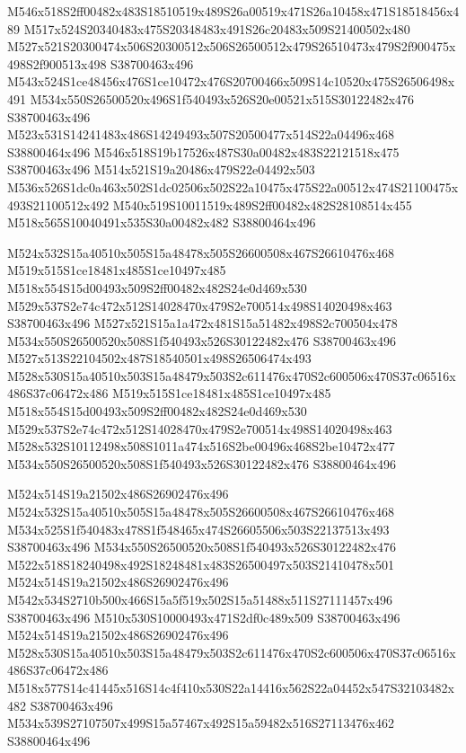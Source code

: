 \documentclass{article}
\begin{document}
\begin{multicols}{2}
M546x518S2ff00482x483S18510519x489S26a00519x471S26a10458x471S18518456x489 M517x524S20340483x475S20348483x491S26c20483x509S21400502x480 M527x521S20300474x506S20300512x506S26500512x479S26510473x479S2f900475x498S2f900513x498 S38700463x496 M543x524S1ce48456x476S1ce10472x476S20700466x509S14c10520x475S26506498x491 M534x550S26500520x496S1f540493x526S20e00521x515S30122482x476 S38700463x496 M523x531S14241483x486S14249493x507S20500477x514S22a04496x468 S38800464x496 M546x518S19b17526x487S30a00482x483S22121518x475 S38700463x496 M514x521S19a20486x479S22e04492x503 M536x526S1dc0a463x502S1dc02506x502S22a10475x475S22a00512x474S21100475x493S21100512x492 M540x519S10011519x489S2ff00482x482S28108514x455 M518x565S10040491x535S30a00482x482 S38800464x496

M524x532S15a40510x505S15a48478x505S26600508x467S26610476x468 M519x515S1ce18481x485S1ce10497x485 M518x554S15d00493x509S2ff00482x482S24e0d469x530 M529x537S2e74c472x512S14028470x479S2e700514x498S14020498x463 S38700463x496 M527x521S15a1a472x481S15a51482x498S2c700504x478 M534x550S26500520x508S1f540493x526S30122482x476 S38700463x496 M527x513S22104502x487S18540501x498S26506474x493 M528x530S15a40510x503S15a48479x503S2c611476x470S2c600506x470S37c06516x486S37c06472x486 M519x515S1ce18481x485S1ce10497x485 M518x554S15d00493x509S2ff00482x482S24e0d469x530 M529x537S2e74c472x512S14028470x479S2e700514x498S14020498x463 M528x532S10112498x508S1011a474x516S2be00496x468S2be10472x477 M534x550S26500520x508S1f540493x526S30122482x476 S38800464x496

M524x514S19a21502x486S26902476x496 M524x532S15a40510x505S15a48478x505S26600508x467S26610476x468 M534x525S1f540483x478S1f548465x474S26605506x503S22137513x493 S38700463x496 M534x550S26500520x508S1f540493x526S30122482x476 M522x518S18240498x492S18248481x483S26500497x503S21410478x501 M524x514S19a21502x486S26902476x496 M542x534S2710b500x466S15a5f519x502S15a51488x511S27111457x496 S38700463x496 M510x530S10000493x471S2df0c489x509 S38700463x496 M524x514S19a21502x486S26902476x496 M528x530S15a40510x503S15a48479x503S2c611476x470S2c600506x470S37c06516x486S37c06472x486 M518x577S14c41445x516S14c4f410x530S22a14416x562S22a04452x547S32103482x482 S38700463x496 M534x539S27107507x499S15a57467x492S15a59482x516S27113476x462 S38800464x496


\end{multicols}
\end{document}
